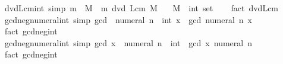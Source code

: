 \begin{isabellebody}
\isanewline
{}\isamarkupfalse%
\ dvd{\isacharunderscore}{\kern0pt}Lcm{\isacharunderscore}{\kern0pt}int\ {\isacharbrackleft}{\kern0pt}simp{\isacharbrackright}{\kern0pt}{\isacharcolon}{\kern0pt}\ {\isachardoublequoteopen}m\ {\isasymin}\ M\ {\isasymLongrightarrow}\ m\ dvd\ Lcm\ M{\isachardoublequoteclose}\isanewline
\ \ \ M\ {\isacharcolon}{\kern0pt}{\isacharcolon}{\kern0pt}\ {\isachardoublequoteopen}int\ set{\isachardoublequoteclose}\isanewline
%
\isadelimproof
\ \ %
\endisadelimproof
%
\isatagproof
{}\isamarkupfalse%
\ {\isacharparenleft}{\kern0pt}fact\ dvd{\isacharunderscore}{\kern0pt}Lcm{\isacharparenright}{\kern0pt}%
\endisatagproof
{\isafoldproof}%
%
\isadelimproof
\isanewline
%
\endisadelimproof
\isanewline
{}\isamarkupfalse%
\ gcd{\isacharunderscore}{\kern0pt}neg{\isacharunderscore}{\kern0pt}numeral{\isacharunderscore}{\kern0pt}{}{\isacharunderscore}{\kern0pt}int\ {\isacharbrackleft}{\kern0pt}simp{\isacharbrackright}{\kern0pt}{\isacharcolon}{\kern0pt}\ {\isachardoublequoteopen}gcd\ {\isacharparenleft}{\kern0pt}{\isacharminus}{\kern0pt}\ numeral\ n\ {\isacharcolon}{\kern0pt}{\isacharcolon}{\kern0pt}\ int{\isacharparenright}{\kern0pt}\ x\ {\isacharequal}{\kern0pt}\ gcd\ {\isacharparenleft}{\kern0pt}numeral\ n{\isacharparenright}{\kern0pt}\ x{\isachardoublequoteclose}\isanewline
%
\isadelimproof
\ \ %
\endisadelimproof
%
\isatagproof
{}\isamarkupfalse%
\ {\isacharparenleft}{\kern0pt}fact\ gcd{\isacharunderscore}{\kern0pt}neg{}{\isacharunderscore}{\kern0pt}int{\isacharparenright}{\kern0pt}%
\endisatagproof
{\isafoldproof}%
%
\isadelimproof
\isanewline
%
\endisadelimproof
\isanewline
{}\isamarkupfalse%
\ gcd{\isacharunderscore}{\kern0pt}neg{\isacharunderscore}{\kern0pt}numeral{\isacharunderscore}{\kern0pt}{}{\isacharunderscore}{\kern0pt}int\ {\isacharbrackleft}{\kern0pt}simp{\isacharbrackright}{\kern0pt}{\isacharcolon}{\kern0pt}\ {\isachardoublequoteopen}gcd\ x\ {\isacharparenleft}{\kern0pt}{\isacharminus}{\kern0pt}\ numeral\ n\ {\isacharcolon}{\kern0pt}{\isacharcolon}{\kern0pt}\ int{\isacharparenright}{\kern0pt}\ {\isacharequal}{\kern0pt}\ gcd\ x\ {\isacharparenleft}{\kern0pt}numeral\ n{\isacharparenright}{\kern0pt}{\isachardoublequoteclose}\isanewline
%
\isadelimproof
\ \ %
\endisadelimproof
%
\isatagproof
{}\isamarkupfalse%
\ {\isacharparenleft}{\kern0pt}fact\ gcd{\isacharunderscore}{\kern0pt}neg{}{\isacharunderscore}{\kern0pt}int{\isacharparenright}{\kern0pt}%
\endisatagproof
{\isafoldproof}%
%
\isadelimproof

\end{isabellebody}
